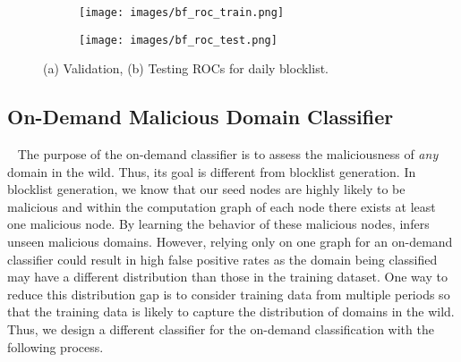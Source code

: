 \begin{figure}
\centering
\begin{subfigure}[t]{0.40\columnwidth}
    \texttt{[image: images/bf\_roc\_train.png]}
    \caption{}
    \label{5roc:training}
  \end{subfigure}
  \begin{subfigure}[t]{0.40\columnwidth}
    \texttt{[image: images/bf\_roc\_test.png]}
    \caption{}
    \label{5roc:testing}
  \end{subfigure}\hfill
  \caption{(a) Validation, (b) Testing ROCs for daily blocklist.}
  \label{5fig:rocs}
\end{figure}



\subsection{On-Demand Malicious Domain Classifier}~\label{ss:ondemand}
The purpose of the on-demand classifier is to assess the maliciousness of \emph{any} domain in the wild. Thus, its goal is different from blocklist generation. In blocklist generation, we know that our seed nodes are highly likely to be malicious and within the computation graph of each node there exists at least one malicious node. By learning the behavior of these malicious nodes, \system infers unseen malicious domains. However, relying only on one graph for an on-demand classifier could result in high false positive rates as the domain being classified may have a different distribution than those in the training dataset. One way to reduce this distribution gap is to consider training data from multiple periods so that the training data is likely to capture the distribution of domains in the wild. Thus, we design a different classifier for the on-demand classification with the following process.




